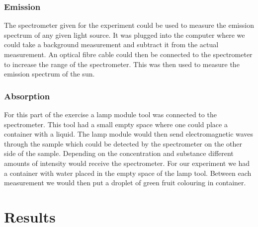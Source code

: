 \documentclass[working, oneside]{inputs/tuftebook}
\begin{document}
\subsubsection*{Emission}
The spectrometer given for the experiment could be used to measure the emission spectrum of any given light source. It was plugged into the computer where we could take a background measurement and subtract it from the actual measurement. An optical fibre cable could then be connected to the spectrometer to increase the range of the spectrometer. This was then used to measure the emission spectrum of the sun.
\subsubsection*{Absorption}
For this part of the exercise a lamp module tool was connected to the spectrometer. This tool had a small  empty space where one could place a container with a liquid. The lamp module would then send electromagnetic waves through the sample which could  be detected by the spectrometer on the other side of the sample. Depending on the concentration and substance different amounts of intensity would receive the spectrometer. For our experiment we had a container with water placed in the empty space of the lamp tool. Between each measurement we would then put a droplet of green fruit colouring in container.  
\section*{Results}
\end{document}
